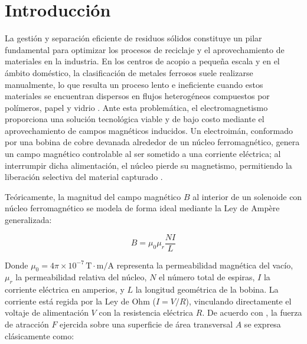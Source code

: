 
\section{Introducción}

La gestión y separación eficiente de residuos sólidos constituye un pilar fundamental para optimizar los procesos de reciclaje y el aprovechamiento de materiales en la industria. En los centros de acopio a pequeña escala y en el ámbito doméstico, la clasificación de metales ferrosos suele realizarse manualmente, lo que resulta un proceso lento e ineficiente cuando estos materiales se encuentran dispersos en flujos heterogéneos compuestos por polímeros, papel y vidrio \parencite{serway2018}. Ante esta problemática, el electromagnetismo proporciona una solución tecnológica viable y de bajo costo mediante el aprovechamiento de campos magnéticos inducidos. Un electroimán, conformado por una bobina de cobre devanada alrededor de un núcleo ferromagnético, genera un campo magnético controlable al ser sometido a una corriente eléctrica; al interrumpir dicha alimentación, el núcleo pierde su magnetismo, permitiendo la liberación selectiva del material capturado \parencite{halliday2014}.

Teóricamente, la magnitud del campo magnético $B$ al interior de un solenoide con núcleo ferromagnético se modela de forma ideal mediante la Ley de Ampère generalizada:

\begin{equation}
  B = \mu_0 \mu_r \frac{N I}{L}
\end{equation}

Donde $\mu_0 = 4\pi \times 10^{-7} \, \text{T}\cdot\text{m/A}$ representa la permeabilidad magnética del vacío, $\mu_r$ la permeabilidad relativa del núcleo, $N$ el número total de espiras, $I$ la corriente eléctrica en amperios, y $L$ la longitud geométrica de la bobina. La corriente está regida por la Ley de Ohm ($I = V/R$), vinculando directamente el voltaje de alimentación $V$ con la resistencia eléctrica $R$. De acuerdo con \textcite{tipler2008}, la fuerza de atracción $F$ ejercida sobre una superficie de área transversal $A$ se expresa clásicamente como:

